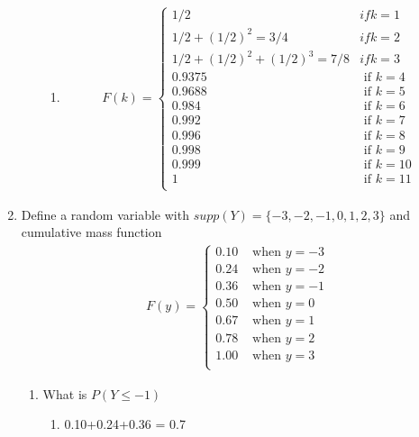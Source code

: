 \documentclass[krantz1,ChapterTOCs]{krantz}
\begin{document}
\begin{enumerate}
\begin{enumerate}
        \begin{enumerate}
            \item {\color{red} 
                \begin{align}
                    F(k) = \begin{cases}
                            1/2 & if k = 1 \\
                            1/2 + (1/2)^2 = 3/4    & if k = 2 \\
                            1/2 + (1/2)^2 + (1/2)^{3} = 7/8    & if k = 3 \\
                            0.9375    & \text{ if } k = 4 \\
                            0.9688    & \text{ if } k = 5 \\
                            0.984    & \text{ if } k = 6 \\
                            0.992    & \text{ if } k = 7 \\
                            0.996    & \text{ if } k = 8 \\
                            0.998    & \text{ if } k = 9 \\
                             0.999   & \text{ if } k = 10 \\
                            1        & \text{ if } k = 11 \\
                           \end{cases}
                \end{align} 
            
            }
        \end{enumerate}

        
    \end{enumerate}
    
    \item Define a random variable with $supp(Y) = \{-3,-2,-1,0,1,2,3\}$ and cumulative mass function 
    \begin{align*}
        F(y) = \begin{cases}
                  0.10  & \text{ when } y = -3\\
                  0.24  & \text{ when } y = -2\\
                  0.36  & \text{ when } y = -1\\
                  0.50  & \text{ when } y =  0\\
                  0.67  & \text{ when } y =  1\\
                  0.78  & \text{ when } y =  2\\
                  1.00  & \text{ when } y =  3\\
               \end{cases}
    \end{align*} 
    \begin{enumerate}
        \item What is $P(Y \leq -1)$
        \begin{enumerate}
            \item {\color{red} 0.10+0.24+0.36 = 0.7   }
        \end{enumerate}
        

\end{enumerate}
\end{enumerate}
\end{document}
